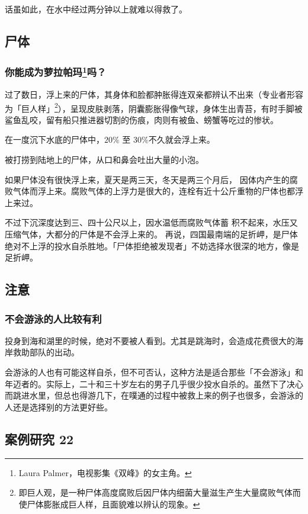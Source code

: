 \documentclass[UTF8]{ctexart}
\begin{document}
话虽如此，在水中经过两分钟以上就难以得救了。


\subsection{尸体}

\subsubsection*{你能成为萝拉帕玛\footnote{Laura Palmer，电视影集《双峰》的女主角。}吗？}

过了数日，浮上来的尸体，其身体和脸都肿胀得连双亲都辨认不出来（专业者形容为「巨人样」\footnote{即巨人观，是一种尸体高度腐败后因尸体内细菌大量滋生产生大量腐败气体而使尸体膨胀成巨人样，且面貌难以辨认的现象。}），呈现皮肤剥落，阴囊膨胀得像气球，身体生出青苔，有时手脚被鲨鱼乱咬，留有船只推进器切割的伤痕，肉则有被鱼、螃蟹等吃过的惨状。

在一度沉下水底的尸体中，$20\%$ 至 $30\%$不久就会浮上来。

被打捞到陆地上的尸体，从口和鼻会吐出大量的小泡。

如果尸体没有很快浮上来，夏天是两三天，冬天是两三个月后， 因体内产生的腐败气体而浮上来。腐败气体的上浮力是很大的，连栓有近十公斤重物的尸体也都浮上来过。

不过下沉深度达到三、四十公尺以上，因水温低而腐败气体蓄 积不起来，水压又压缩气体，大都分的尸体是不会浮上来的。 再说，四国最南端的足折岬，是尸体绝对不上浮的投水自杀胜地。「尸体拒绝被发现者」不妨选择水很深的地方，像是足折岬。

\subsection{注意}

\subsubsection*{不会游泳的人比较有利}

投身到海和湖里的时候，绝对不要被人看到。尤其是跳海时，会造成花费很大的海岸救助部队的出动。

会游泳的人也有可能这样自杀，但不可否认，这种方法是适合那些「不会游泳」和年迈者的。实际上，二十和三十岁左右的男子几乎很少投水自杀的。虽然下了决心而跳进水里，但总也得游几下，在噗通的过程中被救上来的例子也很多，会游泳的人还是选择别的方法更好些。

\subsection{案例研究 22}
\end{document}
